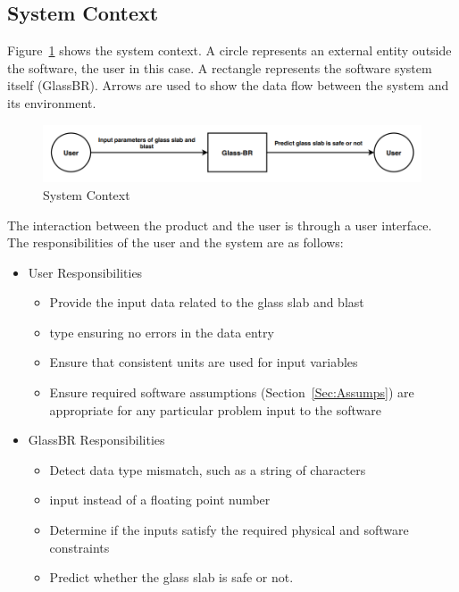 \documentclass[12pt]{article}
\begin{document}
\subsection{System Context}
\label{Sec:SysContext}
Figure~\ref{Figure:sysCtxDiag} shows the system context. A circle represents an external entity outside the software, the user in this case. A rectangle represents the software system itself (GlassBR). Arrows are used to show the data flow between the system and its environment.
\begin{figure}
\begin{center}
\includegraphics[width=\textwidth]{../../../datafiles/GlassBR/SystemContextFigure.png}
\caption{System Context}
\label{Figure:sysCtxDiag}
\end{center}
\end{figure}
The interaction between the product and the user is through a user interface. The responsibilities of the user and the system are as follows:
\begin{itemize}
\item{User Responsibilities}
\begin{itemize}
\item{Provide the input data related to the glass slab and blast}
\item{type ensuring no errors in the data entry}
\item{Ensure that consistent units are used for input variables}
\item{Ensure required software assumptions (Section~\ref{Sec:Assumps}) are appropriate for any particular problem input to the software}
\end{itemize}
\item{GlassBR Responsibilities}
\begin{itemize}
\item{Detect data type mismatch, such as a string of characters}
\item{input instead of a floating point number}
\item{Determine if the inputs satisfy the required physical and software constraints}
\item{Predict whether the glass slab is safe or not.}
\end{itemize}
\end{itemize}
\end{document}

